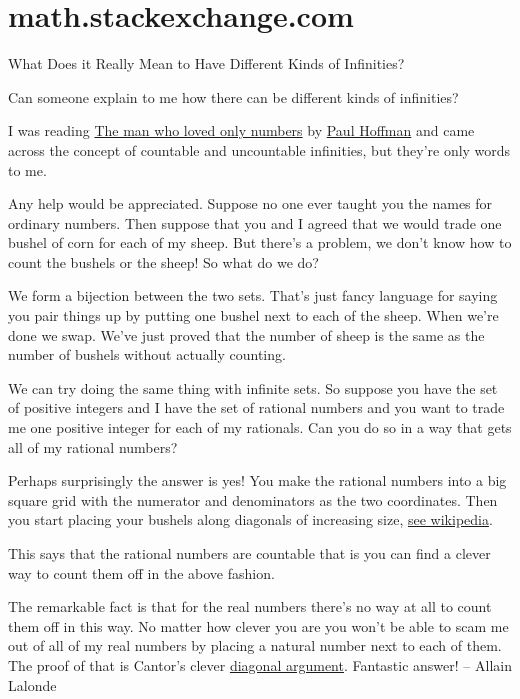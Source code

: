 \chapter{math.stackexchange.com}
What Does it Really Mean to Have Different Kinds of Infinities?

Can someone explain to me how there can be different kinds of infinities?

I was reading \href{http://en.wikipedia.org/wiki/The_Man_Who_Loved_Only_Numbers}{The man who loved only numbers}
by \href{http://en.wikipedia.org/wiki/Paul_Hoffman_(science_writer)}{Paul Hoffman}
and came across the concept of countable and uncountable infinities,
but they're only words to me.

Any help would be appreciated. 
\bs
Suppose no one ever taught you the names for ordinary numbers. Then
suppose that you and I agreed that we would trade one bushel of corn
for each of my sheep. But there's a problem, we don't know how to
count the bushels or the sheep! So what do we do?

We form a  bijection between the two
sets. That's just fancy language for saying you pair things up by
putting one bushel next to each of the sheep. When we're done we swap.
We've just proved that the number of sheep is the same as the number
of bushels without actually counting.

We can try doing the same thing with infinite sets. So suppose you
have the set of positive integers and I have the set of rational numbers
and you want to trade me one positive integer for each of my rationals.
Can you do so in a way that gets all of my rational numbers?

Perhaps surprisingly the answer is yes! You make the rational numbers
into a big square grid with the numerator and denominators as the
two coordinates. Then you start placing your  bushels
along diagonals of increasing size, \href{http://en.wikipedia.org/wiki/File:Pairing_natural.svg}{see wikipedia}.

This says that the rational numbers are  countable
that is you can find a clever way to count them off in the above fashion.

The remarkable fact is that for the real numbers there's no way at
all to count them off in this way. No matter how clever you are you
won't be able to scam me out of all of my real numbers by placing
a natural number next to each of them. The proof of that is Cantor's
clever \href{http://en.wikipedia.org/wiki/Cantor's_diagonal_argument}{diagonal argument}.
\bm
Fantastic answer! -- Allain Lalonde

